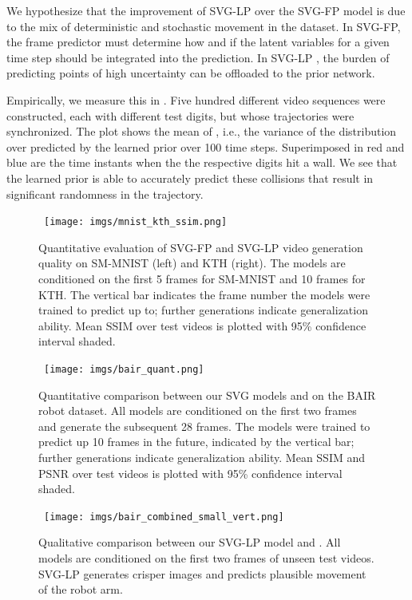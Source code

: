 We hypothesize that the improvement of SVG-LP over the SVG-FP model is
due to the mix of deterministic and stochastic movement in the
dataset.  In SVG-FP, the frame predictor must determine how and if the
latent variables for a given time step should be integrated into the
prediction.  In SVG-LP , the burden of predicting points of high
uncertainty can be offloaded to the prior network.  

Empirically, we
measure this in . Five hundred different video sequences were
constructed, each with different test digits, but whose
trajectories were synchronized. The plot shows the mean of
, i.e., the variance of the distribution over  predicted by the
learned prior over 100 time steps. Superimposed in red and blue are the time
instants when the the respective digits hit a wall. We see that the learned prior is
able to accurately predict these collisions that result in significant
randomness in the trajectory. 








\begin{figure}[t!]
    \centering
\mbox{
  \texttt{[image: imgs/mnist\_kth\_ssim.png]}
 }
 \caption{Quantitative evaluation of SVG-FP and SVG-LP video generation quality on
   SM-MNIST (left) and KTH 
   (right). The models are conditioned on the first 5 frames for
   SM-MNIST and 10 frames for KTH. The vertical bar
   indicates the frame number the models were trained to predict up
   to; further generations indicate generalization ability. 
   Mean SSIM over test videos is plotted with 95\% confidence interval shaded. 
     }
    \label{fig:mnist_kth_ssim}
\end{figure}

\begin{figure}[t!]
    \centering
\mbox{
  \texttt{[image: imgs/bair\_quant.png]}
 }
 \caption{Quantitative comparison between our SVG models and \citet{Babaeizadeh1017} on the BAIR robot dataset. All models are conditioned on the first two frames and generate the subsequent 28 frames. The models were trained to predict up 10 frames in the future, indicated by the vertical bar; further generations indicate generalization ability. Mean SSIM and PSNR over test videos is plotted with 95\% confidence interval shaded.}
    \label{fig:bair_quant}
\end{figure}

\begin{figure}[t!]
    \centering
\mbox{
\texttt{[image: imgs/bair\_combined\_small\_vert.png]}
}
 \caption{Qualitative comparison between our SVG-LP model and \citet{Babaeizadeh1017}. All models are conditioned on the first two frames of unseen test videos. SVG-LP generates crisper images and predicts plausible movement of the robot arm. }
\label{fig:bair}
\end{figure}


